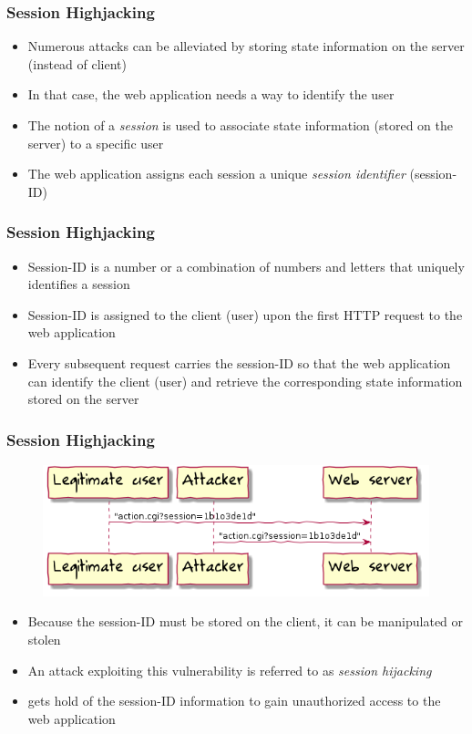 
\begin{frame}
    \frametitle{Session Highjacking}
    \begin{itemize}
        \item Numerous attacks can be alleviated by storing state information on the server (instead of client)
        \item In that case, the web application needs a way to identify the user
        \item The notion of a \emph{session} is used to associate state information (stored on the server) to a specific user
        \item The web application assigns each session a unique \emph{session identifier} (session-ID)
    \end{itemize}
\end{frame}

\begin{frame}
    \frametitle{Session Highjacking}
    \begin{itemize}
        \item Session-ID is a number or a combination of numbers and letters that uniquely identifies a session
        \item Session-ID is assigned to the client (user) upon the first HTTP request to the web application
        \item Every subsequent request carries the session-ID so that the web application can identify the client (user) and retrieve the corresponding state information stored on the server
    \end{itemize}
\end{frame}

\begin{frame}
    \frametitle{Session Highjacking}
    \begin{figure}[htb]
        \centering
        \includegraphics[scale=.5]{uml/session-hijacking.png}
    \end{figure}
    \begin{itemize}
        \item Because the session-ID must be stored on the client, it can be manipulated or stolen
        \item An attack exploiting this vulnerability is referred to as \emph{session hijacking}
        \item \Attacker gets hold of the session-ID information to gain unauthorized access to the web application
    \end{itemize}
\end{frame}

